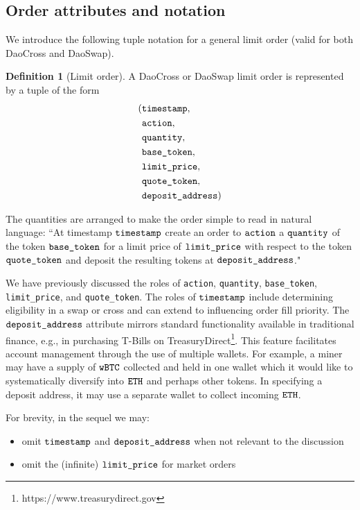 \documentclass[11pt, reqno]{amsart}
\theoremstyle{definition}
\newtheorem{defn}{Definition}[subsection]
\theoremstyle{remark}
\newcommand{\BTC}{\textnormal{\texttt{wBTC}}}
\newcommand{\ETH}{\textnormal{\texttt{ETH}}}
\newcommand{\timestamp}{\textnormal{\texttt{timestamp}}}
\newcommand{\action}{\textnormal{\texttt{action}}}
\newcommand{\quantity}{\textnormal{\texttt{quantity}}}
\newcommand{\basetoken}{\textnormal{\texttt{base\_token}}}
\newcommand{\limitprice}{\textnormal{\texttt{limit\_price}}}
\newcommand{\quotetoken}{\textnormal{\texttt{quote\_token}}}
\newcommand{\depositaddress}{\textnormal{\texttt{deposit\_address}}}
\begin{document}
\subsection{Order attributes and notation}
We introduce the following tuple notation for a general limit order
(valid for both DaoCross and DaoSwap).
\begin{defn}[Limit order]
A DaoCross or DaoSwap limit order is represented by a tuple of the form
\begin{align*}
    ( & \timestamp,       \\
      & \action,          \\
      & \quantity,        \\
      & \basetoken,       \\
      & \limitprice,      \\
      & \quotetoken,      \\
      & \depositaddress )
\end{align*}
\end{defn}

The quantities are arranged to make the order simple to read in natural
language:
``At timestamp $\timestamp$ create an order to $\action$ a $\quantity$ of
the token $\basetoken$ for a limit price of $\limitprice$ with respect to
the token $\quotetoken$ and deposit the resulting tokens at $\depositaddress$."

We have previously discussed the roles of \action, \quantity, \basetoken,
\limitprice, and \quotetoken.
The roles of $\timestamp$ include determining eligibility in a swap or
cross and can extend to influencing order fill priority.
The $\depositaddress$ attribute mirrors standard functionality
available in traditional finance, e.g., in purchasing T-Bills on
TreasuryDirect\footnote{https://www.treasurydirect.gov}. This feature
facilitates account management through the use of multiple wallets. For
example, a miner may have a supply of $\BTC$ collected and held in one wallet
which it would like to systematically diversify into $\ETH$ and perhaps other
tokens. In specifying a deposit address, it may use a separate wallet to collect
incoming $\ETH$.

For brevity, in the sequel we may:
\begin{itemize}
	\item omit $\timestamp$ and $\depositaddress$ when not relevant to the
	      discussion
	\item omit the (infinite) $\limitprice$ for market orders
\end{itemize}
\end{document}

